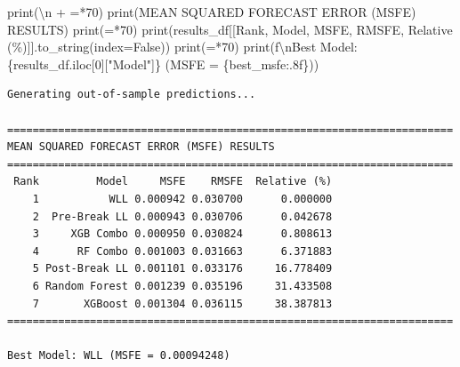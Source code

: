 \documentclass[
  letterpaper,
  DIV=11,
  numbers=noendperiod]{scrartcl}
\newenvironment{Shaded}{\begin{snugshade}}{\end{snugshade}}
\newcommand{\BuiltInTok}[1]{\textcolor[rgb]{0.00,0.23,0.31}{#1}}
\newcommand{\CharTok}[1]{\textcolor[rgb]{0.13,0.47,0.30}{#1}}
\newcommand{\DecValTok}[1]{\textcolor[rgb]{0.68,0.00,0.00}{#1}}
\newcommand{\NormalTok}[1]{\textcolor[rgb]{0.00,0.23,0.31}{#1}}
\newcommand{\OperatorTok}[1]{\textcolor[rgb]{0.37,0.37,0.37}{#1}}
\newcommand{\SpecialCharTok}[1]{\textcolor[rgb]{0.37,0.37,0.37}{#1}}
\newcommand{\SpecialStringTok}[1]{\textcolor[rgb]{0.13,0.47,0.30}{#1}}
\newcommand{\StringTok}[1]{\textcolor[rgb]{0.13,0.47,0.30}{#1}}
\newcommand{\VariableTok}[1]{\textcolor[rgb]{0.07,0.07,0.07}{#1}}
\begin{document}
\begin{Shaded}
\begin{Highlighting}[]
\BuiltInTok{print}\NormalTok{(}\StringTok{\textquotesingle{}}\CharTok{\textbackslash{}n}\StringTok{\textquotesingle{}} \OperatorTok{+} \StringTok{\textquotesingle{}=\textquotesingle{}}\OperatorTok{*}\DecValTok{70}\NormalTok{)}
\BuiltInTok{print}\NormalTok{(}\StringTok{\textquotesingle{}MEAN SQUARED FORECAST ERROR (MSFE) RESULTS\textquotesingle{}}\NormalTok{)}
\BuiltInTok{print}\NormalTok{(}\StringTok{\textquotesingle{}=\textquotesingle{}}\OperatorTok{*}\DecValTok{70}\NormalTok{)}
\BuiltInTok{print}\NormalTok{(results\_df[[}\StringTok{\textquotesingle{}Rank\textquotesingle{}}\NormalTok{, }\StringTok{\textquotesingle{}Model\textquotesingle{}}\NormalTok{, }\StringTok{\textquotesingle{}MSFE\textquotesingle{}}\NormalTok{, }\StringTok{\textquotesingle{}RMSFE\textquotesingle{}}\NormalTok{, }\StringTok{\textquotesingle{}Relative (\%)\textquotesingle{}}\NormalTok{]].to\_string(index}\OperatorTok{=}\VariableTok{False}\NormalTok{))}
\BuiltInTok{print}\NormalTok{(}\StringTok{\textquotesingle{}=\textquotesingle{}}\OperatorTok{*}\DecValTok{70}\NormalTok{)}
\BuiltInTok{print}\NormalTok{(}\SpecialStringTok{f\textquotesingle{}}\CharTok{\textbackslash{}n}\SpecialStringTok{Best Model: }\SpecialCharTok{\{}\NormalTok{results\_df}\SpecialCharTok{.}\NormalTok{iloc[}\DecValTok{0}\NormalTok{][}\StringTok{"Model"}\NormalTok{]}\SpecialCharTok{\}}\SpecialStringTok{ (MSFE = }\SpecialCharTok{\{}\NormalTok{best\_msfe}\SpecialCharTok{:.8f\}}\SpecialStringTok{)\textquotesingle{}}\NormalTok{)}
\end{Highlighting}
\end{Shaded}

\begin{verbatim}
Generating out-of-sample predictions...

======================================================================
MEAN SQUARED FORECAST ERROR (MSFE) RESULTS
======================================================================
 Rank         Model     MSFE    RMSFE  Relative (%)
    1           WLL 0.000942 0.030700      0.000000
    2  Pre-Break LL 0.000943 0.030706      0.042678
    3     XGB Combo 0.000950 0.030824      0.808613
    4      RF Combo 0.001003 0.031663      6.371883
    5 Post-Break LL 0.001101 0.033176     16.778409
    6 Random Forest 0.001239 0.035196     31.433508
    7       XGBoost 0.001304 0.036115     38.387813
======================================================================

Best Model: WLL (MSFE = 0.00094248)
\end{verbatim}
\end{document}
